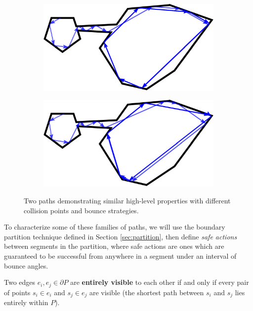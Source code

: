 \documentclass[]{styles/svproc}  %
\begin{document}
\begin{figure}
\centering
\begin{subfigure}{0.5\textwidth}
\includegraphics[width=\linewidth]{figures/twoc_a}
\end{subfigure}%
\begin{subfigure}{0.5\textwidth}
\includegraphics[width=\linewidth]{figures/twoc_b}
\end{subfigure}
\caption{Two paths demonstrating similar high-level properties with different
collision points and bounce strategies.}
\label{fig:twopaths}
\end{figure}

To characterize some of these families of paths, we will use the boundary
partition technique defined in Section \ref{sec:partition}, then define
\emph{safe actions} between segments in the partition, where safe actions are
ones which are guaranteed to be successful from anywhere in a segment under an
interval of bounce angles.

\begin{definition}
Two edges $e_i,e_j \in \partial P$ are \textbf{entirely visible} to each other if
and only if every pair of points $s_i \in e_i$ and $s_j \in e_j$ are visible (the
shortest path between $s_i$ and $s_j$ lies entirely within $P$).
\end{definition}
\end{document}
